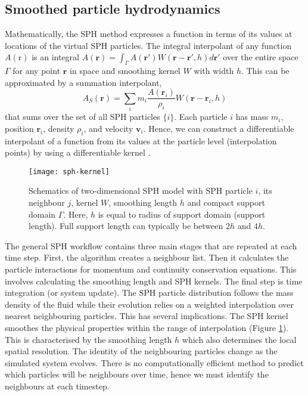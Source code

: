 \documentclass[10pt]{iopart}
\begin{document}
\subsection{Smoothed particle hydrodynamics}\label{ssec:SPH}

Mathematically, the SPH method expresses a function in terms of its values at locations of the virtual SPH particles. The integral interpolant of any function $A(\mathrm{r})$ is an integral $A(\mathbf{r}) = \int_\Gamma A(\mathbf{r'}) W(\mathbf{r}-\mathbf{r'},h) d\mathbf{r'}$ over the entire space $\Gamma$ for any point $\mathbf{r}$ in space and smoothing kernel $W$ with width $h$. This can be approximated by a summation interpolant,
\begin{equation}\label{eq:sph-interpolant}
A_S(\mathbf{r}) = \sum_i m_i \frac{A(\mathbf{r}_i)}{\rho_i} W(\mathbf{r}-\mathbf{r}_i,h)
\end{equation}
that sums over the set of all SPH particles $\{i\}$. Each particle $i$ has mass $m_i$, position $\mathbf{r}_i$, density $\rho_i$, and velocity $\mathbf{v}_i$. Hence, we can construct a differentiable interpolant of a function from its values at the particle level (interpolation points) by using a differentiable kernel \cite{Monaghan2005}.

\begin{figure}[ht!]
\centering
\texttt{[image: sph-kernel]}
\caption{Schematics of two-dimensional SPH model with SPH particle $i$, its neighbour $j$, kernel $W$, smoothing length $h$ and compact support domain $\Gamma$. Here, $h$ is equal to radius of support domain (support length). Full support length can typically be between $2h$ and $4h$.}
\label{fig:sph-kernel}
\end{figure}

The general SPH workflow contains three main stages that are repeated at each time step. First, the algorithm creates a neighbour list. Then it calculates the particle interactions for momentum and continuity conservation equations. This involves calculating the smoothing length and SPH kernels. The final step is time integration (or system update). The SPH particle distribution follows the mass density of the fluid while their evolution relies on a weighted interpolation over nearest neighbouring particles. This has several implications. The SPH kernel smoothes the physical properties within the range of interpolation (Figure \ref{fig:sph-kernel}). This is characterised by the smoothing length $h$ which also determines the local spatial resolution. The identity of the neighbouring particles change as the simulated system evolves. There is no computationally efficient method to predict which particles will be neighbours over time, hence we must identify the neighbours at each timestep.
\end{document}
